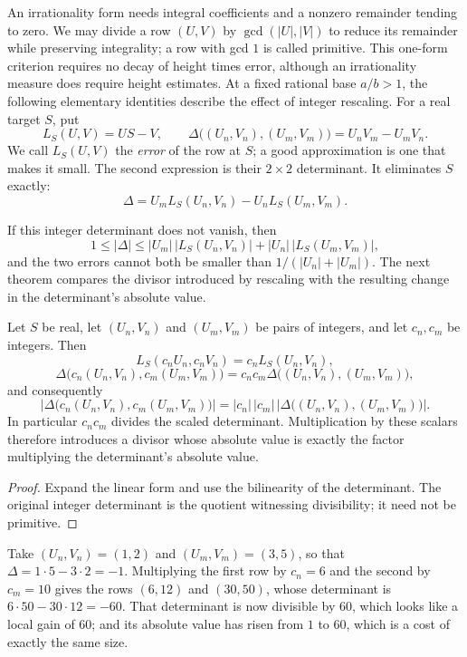 \documentclass[11pt]{article}
\begin{document}
An irrationality form needs integral coefficients and a nonzero
remainder tending to zero. We may divide a row $(U,V)$ by
$\gcd(|U|,|V|)$ to reduce its remainder while preserving integrality;
a row with gcd $1$ is called primitive. This one-form criterion
requires no decay of height times error, although an irrationality
measure does require height estimates. At a fixed rational base
$a/b>1$, the following elementary identities describe the effect of
integer rescaling. For a real target $S$, put
\[
 L_S(U,V)=US-V,
 \qquad
 \Delta\bigl((U_n,V_n),(U_m,V_m)\bigr)=U_nV_m-U_mV_n.
\]
We call \(L_S(U,V)\) the \emph{error} of the row at \(S\); a good approximation
is one that makes it small.  The second expression is their $2\times2$ determinant. It eliminates
\(S\) exactly:
\[
\Delta=U_mL_S(U_n,V_n)-U_nL_S(U_m,V_m).
\]

If this integer determinant does not vanish, then
\[
 1\le|\Delta|
  \le|U_m|\,\bigl|L_S(U_n,V_n)\bigr|+|U_n|\,\bigl|L_S(U_m,V_m)\bigr|,
\]
and the two errors cannot both be smaller than
\(1/(|U_n|+|U_m|)\).  The next theorem compares the divisor introduced by rescaling with
the resulting change in the determinant's absolute value.

\begin{theorem}\label{long1049:res:content}
Let \(S\) be real, let \((U_n,V_n)\) and \((U_m,V_m)\) be pairs of integers, and
let \(c_n,c_m\) be integers.  Then
\[
 L_S(c_nU_n,c_nV_n)=c_nL_S(U_n,V_n),
\]
\[
 \Delta\bigl(c_n(U_n,V_n),c_m(U_m,V_m)\bigr)
 =c_nc_m\Delta\bigl((U_n,V_n),(U_m,V_m)\bigr),
\]
and consequently
\[
 \left|\Delta\bigl(c_n(U_n,V_n),c_m(U_m,V_m)\bigr)\right|
 =|c_n|\,|c_m|\,
   \left|\Delta\bigl((U_n,V_n),(U_m,V_m)\bigr)\right|.
\]
In particular \(c_nc_m\) divides the scaled determinant. Multiplication
by these scalars therefore introduces a divisor whose absolute value is
exactly the factor multiplying the determinant's absolute value.
\end{theorem}

\begin{proof}
Expand the linear form and use the bilinearity of the determinant.
The original integer determinant is the quotient witnessing divisibility;
it need not be primitive.
\end{proof}

\begin{example}\label{long1049:ex:content}
Take \((U_n,V_n)=(1,2)\) and \((U_m,V_m)=(3,5)\), so that
\(\Delta=1\cdot5-3\cdot2=-1\).  Multiplying the first row by \(c_n=6\) and the
second by \(c_m=10\) gives the rows \((6,12)\) and \((30,50)\), whose
determinant is \(6\cdot50-30\cdot12=-60\).  That determinant is now divisible
by \(60\), which looks like a local gain of \(60\); and its absolute value has
risen from \(1\) to \(60\), which is a cost of exactly the same size.
\end{example}
\end{document}
